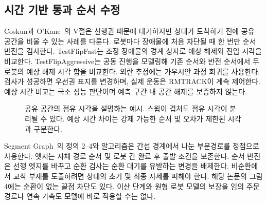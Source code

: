 \documentclass[11pt,a4paper]{article}
\theoremstyle{remark}
\begin{document}
\subsection{시간 기반 통과 순서 수정}
\label{sec:time-repair-review}
Coskun과 O'Kane~\cite{coskun2019}의 V절은 선행권 때문에 대기하지만 상대가 도착하기 전에 공유 공간을 비울 수 있는 사례를 다룬다. 로봇마다 장애물에 처음 차단될 때 한 번만 순서 반전을 검사한다. TestFlipFast는 조정 장애물의 경계 상자로 예상 해제와 진입 시각을 비교한다. TestFlipAggressive는 공동 진행을 모델링해 기존 순서와 반전 순서에서 두 로봇의 예상 해제 시각 합을 비교한다. 외란 추정에는 가우시안 과정 회귀를 사용한다. 검사가 성공하면 우선권 표지를 변경하며, 실제 운동은 RMTRACK이 계속 제어한다. 예상 시간 비교는 국소 성능 판단이며 예측 구간 내 공간 해제를 보증하지 않는다.
\begin{figure}[htbp]
\centering
{}
\caption{공유 공간의 점유 시각을 설명하는 예시. 스윕이 겹쳐도 점유 시각이 분리될 수 있다. 예상 시간 차이는 강제 가능한 순서 및 오차가 제한된 시각과 구분한다.}
\label{fig:timed-separation}
\end{figure}

Segment Graph~\cite{coskun2021}의 정의 2--4와 알고리즘은 간섭 경계에서 나눈 부분경로를 정점으로 사용한다. 엣지는 자체 경로 순서 및 로봇 간 완료 후 출발 조건을 보존한다. 순서 반전은 선행 엣지를 바꾸고 순환 검사는 순환 대기를 유발하는 변경을 배제한다. 비순환에서 교착 부재를 도출하려면 상대의 초기 및 최종 자세를 피해야 한다. 해당 논문의 그림 4에는 순환이 없는 끝점 차단도 있다. 이산 단계와 원형 로봇 모델의 보장을 임의 주문 경로나 연속 가속도 모델에 바로 적용할 수는 없다.
\end{document}

